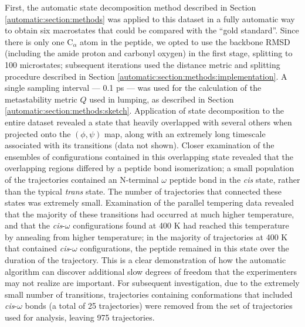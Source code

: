 First, the automatic state decomposition method described in Section \ref{automatic:section:methods} was applied to this dataset in a fully automatic way to obtain six macrostates that could be compared with the ``gold standard''.
Since there is only one C$_\alpha$ atom in the peptide, we opted to use the backbone RMSD (including the amide proton and carbonyl oxygen) in the first stage, splitting to 100 microstates; subsequent iterations used the distance metric and splitting procedure described in Section \ref{automatic:section:methods:implementation}.
A single sampling interval --- 0.1 ps --- was used for the calculation of the metastability metric $Q$ used in lumping, as described in Section \ref{automatic:section:methods:sketch}.
Application of state decomposition to the entire dataset revealed a state that heavily overlapped with several others when projected onto the $(\phi,\psi)$ map, along with an extremely long timescale associated with its transitions (data not shown).
Closer examination of the ensembles of configurations contained in this overlapping state revealed that the overlapping regions differed by a peptide bond isomerization; a small population of the trajectories contained an N-terminal $\omega$ peptide bond in the \emph{cis} state, rather than the typical \emph{trans} state.
The number of trajectories that connected these states was extremely small.
Examination of the parallel tempering data revealed that the majority of these transitions had occurred at much higher temperature, and that the \emph{cis}-$\omega$ configurations found at 400 K had reached this temperature by annealing from higher temperature; in the majority of trajectories at 400 K that contained \emph{cis}-$\omega$ configurations, the peptide remained in this state over the duration of the trajectory.
This is a clear demonstration of how the automatic algorithm can discover additional slow degrees of freedom that the experimenters may not realize are important.
For subsequent investigation, due to the extremely small number of transitions, trajectories containing conformations that included \emph{cis}-$\omega$ bonds (a total of 25 trajectories) were removed from the set of trajectories used for analysis, leaving 975 trajectories.

